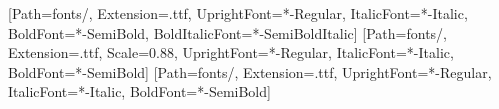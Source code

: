 \usepackage{xcolor}

\setmainfont{IBMPlexSans}[Path=fonts/, Extension=.ttf, UprightFont=*-Regular, ItalicFont=*-Italic,
  BoldFont=*-SemiBold, BoldItalicFont=*-SemiBoldItalic]
\setmonofont{IBMPlexMono}[Path=fonts/, Extension=.ttf, Scale=0.88, UprightFont=*-Regular, ItalicFont=*-Italic, BoldFont=*-SemiBold]
\newfontfamily{}[Path=fonts/, Extension=.ttf, UprightFont=*-Regular, ItalicFont=*-Italic, BoldFont=*-SemiBold]

\usepackage{graphicx}
\usepackage{fancyhdr}
\usepackage{titlesec}
\usepackage{titletoc}
\usepackage{caption}
\usepackage{booktabs}
\usepackage{colortbl}
\usepackage{float}
\usepackage{enumitem}

\color{ink}
\linespread{1.18}
\setlength{\parindent}{0pt}
\setlength{\parskip}{0.7em}

\pagestyle{fancy}
\fancyhf{}
\fancyhead[L]{\footnotesize\color{muted}\nouppercase{\leftmark}}
\fancyhead[R]{\footnotesize\color{muted}\thepage}
\renewcommand{\headrulewidth}{0pt}
\renewcommand{\chaptermark}[1]{\markboth{\thechapter.\ #1}{}}

